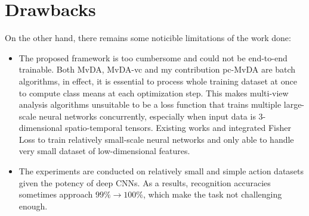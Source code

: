 
\section{Drawbacks} \label{sec:drawbacks}

    On the other hand, there remains some noticible limitations of the work done:
    \begin{itemize}
        \item The proposed framework is too cumbersome and could not be end-to-end trainable.
        Both MvDA, MvDA-vc and my contribution pc-MvDA are batch algorithms, in effect, it is essential to process whole training dataset at once to compute class means at each optimization step.
        This makes multi-view analysis algorithms unsuitable to be a loss function that trains multiple large-scale neural networks concurrently, especially when input data is 3-dimensional spatio-temporal tensors.
        Existing works \cite{kan2016multi} and \cite{cao2017generalized} integrated Fisher Loss to train relatively small-scale neural networks and only able to handle very small dataset of low-dimensional features.
        \item The experiments are conducted on relatively small and simple action datasets given the potency of deep CNNs.
        As a results, recognition accuracies sometimes approach $99\%\to100\%$, which make the task not challenging enough.
    \end{itemize}
